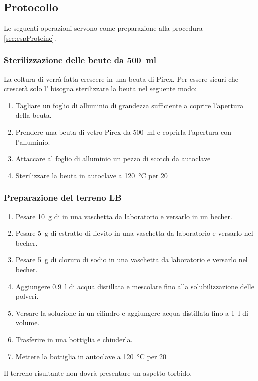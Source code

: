 \subsection{Protocollo}
Le seguenti operazioni servono come preparazione alla procedura \ref{sec:espProteine}.
\subsubsection{Sterilizzazione delle beute da {\boldmath \qty{500}{\ml}}}
La coltura di  verrà fatta crescere in una beuta di Pirex. Per essere sicuri che crescerà solo l' bisogna sterilizzare la beuta nel seguente modo:
\begin{enumerate}
	\item Tagliare un foglio di alluminio di grandezza sufficiente a coprire l’apertura della beuta.
	\item Prendere una beuta di vetro Pirex da \qty{500}{\ml} e coprirla l'apertura con l’alluminio.
	\item Attaccare al foglio di alluminio un pezzo di scotch da autoclave
	\item Sterilizzare la beuta in autoclave a \qty{120}{\celsius} per \qty{20}{\min}
\end{enumerate}

\endgroup

\subsubsection{Preparazione del terreno LB}
\begin{enumerate}
	\item Pesare \qty{10}{\g} di  in una vaschetta da laboratorio e versarlo in un becher.
	\item Pesare \qty{5}{\g} di estratto di lievito in una vaschetta da laboratorio e versarlo nel becher.
	\item Pesare \qty{5}{\g} di cloruro di sodio in una vaschetta da laboratorio e versarlo nel becher.
	\item Aggiungere \qty{0.9}{\l} di acqua distillata e mescolare fino alla solubilizzazione delle polveri.
	\item Versare la soluzione in un cilindro e aggiungere acqua distillata fino a \qty{1}{\litre} di volume.
	\item Trasferire in una bottiglia e chiuderla.
	\item Mettere la bottiglia in autoclave a \qty{120}{\celsius} per \qty{20}{\min}
\end{enumerate}
Il terreno risultante non dovrà presentare un aspetto torbido.

